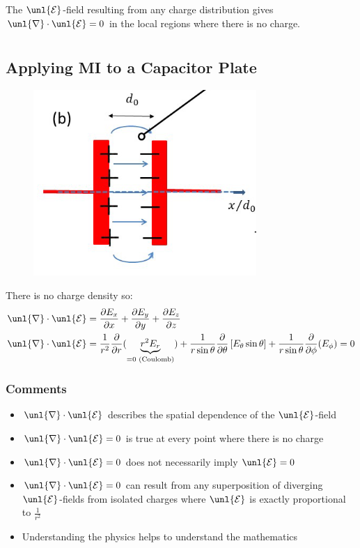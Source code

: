 \documentclass[a4paper, 11pt, normalem]{report}
\newcommand\p{\partial}
\newcommand\E{\mathcal{E}}
\newcommand\uE{\unl{\E}}
\newcommand\del{\unl{\nabla}}
\begin{document}
The $\uE$-field resulting from any charge distribution gives $\del \cdot \uE = 0$ in the local regions where there is no charge.

\chapter{}
\section{Applying M\RN{1} to a Capacitor Plate}
\begin{figure}
    \begin{center}
        \vspace{-20pt}
        \includegraphics[scale=0.4]{cap.png}
        \vspace{-90pt}
    \end{center}
\end{figure}
There is no charge density so:
\begin{align}
    \del\cdot\uE &= \frac{\p E_x}{\p x} + \frac{\p E_y}{\p y} + \frac{\p E_z}{\p z} \\
    \del\cdot\uE &= \frac{1}{r^2}\frac{\p}{\p r}(\underbrace{r^2 E_r}_{= 0\text{ (Coulomb)}}) + \frac{1}{r\sin\theta}\frac{\p}{\p \theta}\left[E_\theta\sin\theta\right] + \frac{1}{r\sin\theta}\frac{\p}{\p \phi}(E_\phi) = 0
\end{align}

\subsection{Comments}
\begin{itemize}
    \item $\del\cdot\uE$ describes the spatial dependence of the $\uE$-field
    \item $\del\cdot\uE = 0$ is true at every point where there is no charge
    \item $\del\cdot\uE = 0$ does not necessarily imply $\uE = 0$
    \item $\del\cdot\uE = 0$ can result from any superposition of diverging $\uE$-fields from isolated charges where $\uE$ is exactly proportional to $\frac{1}{r^2}$
    \item Understanding the physics helps to understand the mathematics
\end{itemize}
\end{document}
